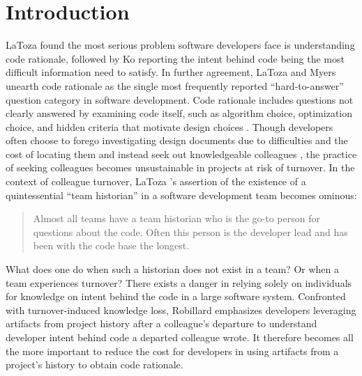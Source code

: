
\chapter{Introduction}
\label{ch:Introduction}


LaToza \etal \cite{latoza_maintaining_2006} found the most serious problem software developers face is understanding code rationale, followed by Ko \etal \cite{ko_information_2007} reporting the intent behind code being the most difficult information need to satisfy. 
In further agreement, LaToza and Myers \cite{latoza_hard-answer_2010} unearth code rationale as the single most frequently reported “hard-to-answer” question category in software development. 
Code rationale includes questions not clearly answered by examining code itself, such as algorithm choice, optimization choice, and hidden criteria that motivate design choices \cite{latoza_hard-answer_2010}. 
Though developers often choose to forego investigating design documents due to difficulties and the cost of locating them and instead seek out knowledgeable colleagues \cite{latoza_maintaining_2006}, the practice of seeking colleagues becomes unsustainable in projects at risk of turnover. 
In the context of colleague turnover, LaToza \etal 's assertion of the existence of a quintessential ``team historian'' in a software development team \cite{latoza_maintaining_2006} becomes ominous:

\begin{quote}
Almost all teams have a team historian who is the go-to person for questions about the
code. Often this person is the developer lead and has been with the code base the longest.
\end{quote}

What does one do when such a historian does not exist in a team? Or when a team experiences turnover?
There exists a danger in relying solely on individuals for knowledge on intent behind the code in a large software system.
Confronted with turnover-induced knowledge loss, Robillard \cite{robillard_turnover-induced_2021} emphasizes developers leveraging artifacts from project history after a colleague’s departure to understand developer intent behind code a departed colleague wrote. 
It therefore becomes all the more important to reduce the cost for developers in using artifacts from a project's history to obtain code rationale. 

